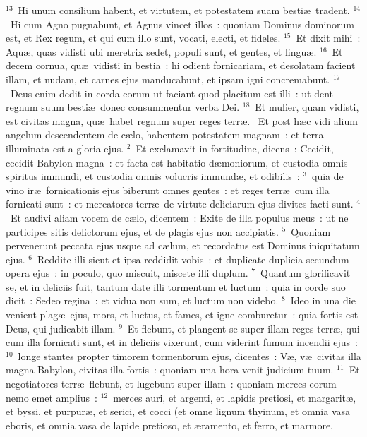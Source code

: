 ${}^{13}$~Hi unum consilium habent, et virtutem, et potestatem suam besti\ae\ tradent.
${}^{14}$~Hi cum Agno pugnabunt, et Agnus vincet illos~: quoniam Dominus dominorum est, et Rex regum, et qui cum illo sunt, vocati, electi, et fideles.
${}^{15}$~Et dixit mihi~: Aqu\ae , quas vidisti ubi meretrix sedet, populi sunt, et gentes, et lingu\ae .
${}^{16}$~Et decem cornua, qu\ae\ vidisti in bestia~: hi odient fornicariam, et desolatam facient illam, et nudam, et carnes ejus manducabunt, et ipsam igni concremabunt.
${}^{17}$~Deus enim dedit in corda eorum ut faciant quod placitum est illi~: ut dent regnum suum besti\ae\ donec consummentur verba Dei.
${}^{18}$~Et mulier, quam vidisti, est civitas magna, qu\ae\ habet regnum super reges terr\ae .
~Et post h\ae c vidi alium angelum descendentem de c\ae lo, habentem potestatem magnam~: et terra illuminata est a gloria ejus.
${}^{2}$~Et exclamavit in fortitudine, dicens~: Cecidit, cecidit Babylon magna~: et facta est habitatio d\ae moniorum, et custodia omnis spiritus immundi, et custodia omnis volucris immund\ae , et odibilis~:
${}^{3}$~quia de vino ir\ae\ fornicationis ejus biberunt omnes gentes~: et reges terr\ae\ cum illa fornicati sunt~: et mercatores terr\ae\ de virtute deliciarum ejus divites facti sunt.
${}^{4}$~Et audivi aliam vocem de c\ae lo, dicentem~: Exite de illa populus meus~: ut ne participes sitis delictorum ejus, et de plagis ejus non accipiatis.
${}^{5}$~Quoniam pervenerunt peccata ejus usque ad c\ae lum, et recordatus est Dominus iniquitatum ejus.
${}^{6}$~Reddite illi sicut et ipsa reddidit vobis~: et duplicate duplicia secundum opera ejus~: in poculo, quo miscuit, miscete illi duplum.
${}^{7}$~Quantum glorificavit se, et in deliciis fuit, tantum date illi tormentum et luctum~: quia in corde suo dicit~: Sedeo regina~: et vidua non sum, et luctum non videbo.
${}^{8}$~Ideo in una die venient plag\ae\ ejus, mors, et luctus, et fames, et igne comburetur~: quia fortis est Deus, qui judicabit illam.
${}^{9}$~Et flebunt, et plangent se super illam reges terr\ae , qui cum illa fornicati sunt, et in deliciis vixerunt, cum viderint fumum incendii ejus~:
${}^{10}$~longe stantes propter timorem tormentorum ejus, dicentes~: V\ae , v\ae\ civitas illa magna Babylon, civitas illa fortis~: quoniam una hora venit judicium tuum.
${}^{11}$~Et negotiatores terr\ae\ flebunt, et lugebunt super illam~: quoniam merces eorum nemo emet amplius~:
${}^{12}$~merces auri, et argenti, et lapidis pretiosi, et margarit\ae , et byssi, et purpur\ae , et serici, et cocci (et omne lignum thyinum, et omnia vasa eboris, et omnia vasa de lapide pretioso, et \ae ramento, et ferro, et marmore,
